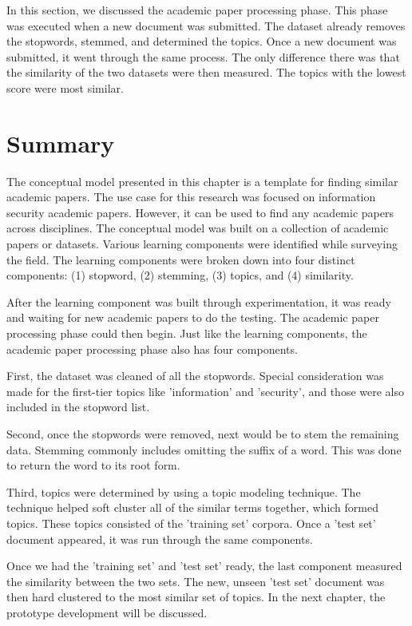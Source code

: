 In this section, we discussed the academic paper processing phase. This phase was executed when a new document was submitted. The dataset already removes the stopwords, stemmed, and determined the topics. Once a new document was submitted, it went through the same process. The only difference there was that the similarity of the two datasets were then measured. The topics with the lowest score were most similar.

\section{Summary}

The conceptual model presented in this chapter is a template for finding similar academic papers. The use case for this research was focused on information security academic papers. However, it can be used to find any academic papers across disciplines. The conceptual model was built on a collection of academic papers or datasets. Various learning components were identified while surveying the field. The learning components were broken down into four distinct components: (1) stopword, (2) stemming, (3) topics, and (4) similarity.

After the learning component was built through experimentation, it was ready and waiting for new academic papers to do the testing. The academic paper processing phase could then begin. Just like the learning components, the academic paper processing phase also has four components.

First, the dataset was cleaned of all the stopwords. Special consideration was made for the first-tier topics like ’information’ and ’security’, and those were also included in the stopword list.

Second, once the stopwords were removed, next would be to stem the remaining data. Stemming commonly includes omitting the suffix of a word. This was done to return the word to its root form.

Third, topics were determined by using a topic modeling technique. The technique helped soft cluster all of the similar terms together, which formed topics. These topics consisted of the ’training set’ corpora. Once a ’test set’ document appeared, it was run through the same components.

Once we had the ’training set’ and ’test set’ ready, the last component measured the similarity between the two sets. The new, unseen ’test set’ document was then hard clustered to the most similar set of topics. In the next chapter, the prototype development will be discussed.
